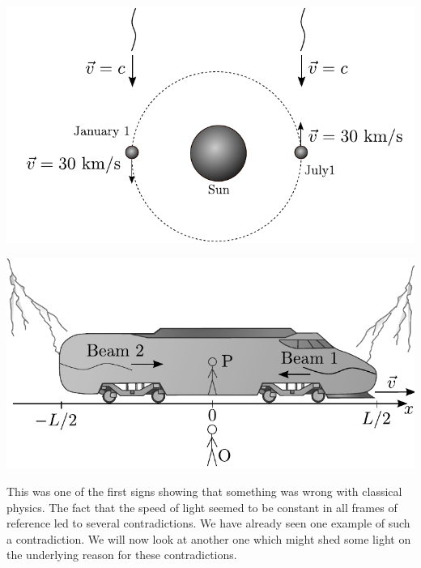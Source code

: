 {\begin{multicols}{2}
\begin{Figure}%
\centering
\includegraphics[width=\textwidth]{fig_7-3.pdf}
\end{Figure}

\begin{Figure}%
\centering
\includegraphics[width=\textwidth]{fig_7-4x.pdf}
\end{Figure}

This was one of the first signs showing that something was wrong with classical physics. The fact that the speed of light seemed to be constant in all frames of reference led to several contradictions. We have already seen one example of such a contradiction. We will now look at another one which might shed some light on the underlying reason for these contradictions. 


\end{multicols}}
